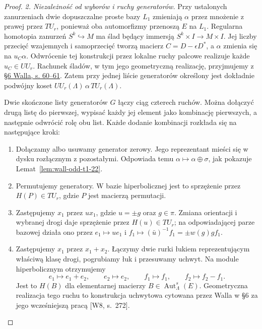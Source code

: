 \begin{proof}
\emph{2. Niezależność od wyborów i ruchy generatorów.}
Przy ustalonych zanurzeniach dwie dopuszczalne
proste bazy $L_1$ zmieniają $\alpha$ przez
mnożenie z prawej przez $TU_r$, ponieważ
oba automorfizmy przenoszą $E$ na $L_1$.
Regularna
homotopia zanurzeń $S^k\hookrightarrow M$
ma ślad będący immersją
$S^k\times I\to M\times I$.
Jej liczby przecięć wzajemnych i samoprzecięć
tworzą macierz $C=D-\epsilon D^*$, a
$\alpha$ zmienia się na $u_C\alpha$.
Odwrócenie tej konstrukcji przez lokalne ruchy
palcowe realizuje każde $u_C\in UU_r$.
Rachunek śladów, w tym jego geometryczną
realizację, przyjmujemy z
\href{https://www.maths.ed.ac.uk/~v1ranick/books/scm.pdf}
{§6 Walla, s. 60--61}.
Zatem przy jednej liście generatorów określony
jest dokładnie podwójny koset
$UU_r(\Lambda)\,\alpha\,TU_r(\Lambda)$.

Dwie skończone listy generatorów $G$ łączy
ciąg czterech ruchów. Można dołączyć drugą
listę do pierwszej, wypisać każdy jej element
jako kombinację pierwszych, a następnie
odwrócić rolę obu list. Każde dodanie
kombinacji rozkłada się na następujące kroki:
\begin{enumerate}
 \item[(T1)] Dołączamy albo usuwamy generator
 zerowy. Jego reprezentant mieści się w dysku
 rozłącznym z pozostałymi. Odpowiada temu
 $\alpha\mapsto\alpha\oplus\sigma$,
 jak pokazuje Lemat~\ref{lem:wall-odd-t1-22}.
 \item[(T2)] Permutujemy generatory. W bazie
 hiperbolicznej jest to sprzężenie przez
 $H(P)\in TU_r$, gdzie $P$ jest macierzą
 permutacji.
 \item[(T3)] Zastępujemy $x_1$ przez $u x_1$,
 gdzie $u=\pm g$ oraz $g\in\pi$. Zmiana
 orientacji i wybranej drogi daje sprzężenie
 przez $H(u)\in TU_r$; na odpowiadającej
 parze bazowej działa ono przez
 $e_1\mapsto u e_1$ i
 $f_1\mapsto(\bar u)^{-1}f_1
             =\pm w(g)g f_1$.
 \item[(T4)] Zastępujemy $x_1$ przez
 $x_1+x_2$. Łączymy dwie rurki łukiem
 reprezentującym właściwą klasę drogi,
 pogrubiamy łuk i przesuwamy uchwyt.
 Na module hiperbolicznym otrzymujemy
 \[
 e_1\mapsto e_1+e_2,\qquad e_2\mapsto e_2,
 \qquad f_1\mapsto f_1,\qquad f_2\mapsto f_2-f_1.
 \]
 Jest to $H(B)$ dla elementarnej macierzy
 $B\in\operatorname{Aut}^s_\Lambda(E)$.
 Geometryczna realizacja tego ruchu to
 konstrukcja uchwytowa cytowana przez Walla
 w §6 za jego wcześniejszą pracą [W8, s.~272].
\end{enumerate}


\end{proof}

